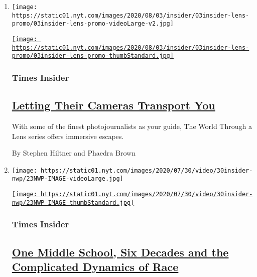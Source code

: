 \begin{enumerate}
\def\labelenumi{\arabic{enumi}.}
\item
  \texttt{[image: https://static01.nyt.com/images/2020/08/03/insider/03insider-lens-promo/03insider-lens-promo-videoLarge-v2.jpg]}

  \href{/2020/08/03/insider/letting-their-cameras-transport-you.html}{\texttt{[image: https://static01.nyt.com/images/2020/08/03/insider/03insider-lens-promo/03insider-lens-promo-thumbStandard.jpg]}}

  \hypertarget{times-insider}{%
  \subsubsection{Times Insider}\label{times-insider}}

  \hypertarget{letting-their-cameras-transport-you}{%
  \subsection{\texorpdfstring{\href{/2020/08/03/insider/letting-their-cameras-transport-you.html}{Letting
  Their Cameras Transport
  You}}{Letting Their Cameras Transport You}}\label{letting-their-cameras-transport-you}}

  With some of the finest photojournalists as your guide, The World
  Through a Lens series offers immersive escapes.

  By Stephen Hiltner and Phaedra Brown
\item
  \texttt{[image: https://static01.nyt.com/images/2020/07/30/video/30insider-nwp/23NWP-IMAGE-videoLarge.jpg]}

  \href{/2020/07/30/insider/nice-white-parents.html}{\texttt{[image: https://static01.nyt.com/images/2020/07/30/video/30insider-nwp/23NWP-IMAGE-thumbStandard.jpg]}}

  \hypertarget{times-insider-1}{%
  \subsubsection{Times Insider}\label{times-insider-1}}

  \hypertarget{one-middle-school-six-decades-and-the-complicated-dynamics-of-race}{%
  \subsection{\texorpdfstring{\href{/2020/07/30/insider/nice-white-parents.html}{One
  Middle School, Six Decades and the Complicated Dynamics of
  Race}}{One Middle School, Six Decades and the Complicated Dynamics of Race}}\label{one-middle-school-six-decades-and-the-complicated-dynamics-of-race}}


\end{enumerate}
